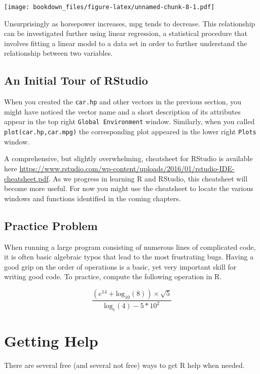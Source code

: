 \documentclass[]{krantz}
\begin{document}
\texttt{[image: bookdown\_files/figure-latex/unnamed-chunk-8-1.pdf]}

Unsurprisingly as horsepower increases, mpg tends to decrease. This
relationship can be investigated further using linear regression, a
statistical procedure that involves fitting a linear model to a data set
in order to further understand the relationship between two variables.

\subsection{An Initial Tour of
RStudio}\label{an-initial-tour-of-rstudio}

When you created the \texttt{car.hp} and other vectors in the previous
section, you might have noticed the vector name and a short description
of its attributes appear in the top right \texttt{Global\ Environment}
window. Similarly, when you called \texttt{plot(car.hp,car.mpg)} the
corresponding plot appeared in the lower right \texttt{Plots} window.

A comprehensive, but slightly overwhelming, cheatsheet for RStudio is
available here
\url{https://www.rstudio.com/wp-content/uploads/2016/01/rstudio-IDE-cheatsheet.pdf}.
As we progress in learning R and RStudio, this cheatsheet will become
more useful. For now you might use the cheatsheet to locate the various
windows and functions identified in the coming chapters.

\subsection{Practice Problem}\label{practice-problem}

When running a large program consisting of numerous lines of complicated
code, it is often basic algebraic typos that lead to the most
frustrating bugs. Having a good grip on the order of operations is a
basic, yet very important skill for writing good code. To practice,
compute the following operation in R.

\[
\frac{(e^{14} + \text{log}_{10}(8)) \times \sqrt{5}}{\text{log}_{e}(4) - 5 * 10^2}
\]

\section{Getting Help}\label{getting-help}

There are several free (and several not free) ways to get R help when
needed.
\end{document}
